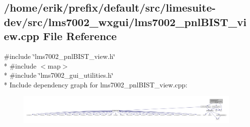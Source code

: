 \subsection{/home/erik/prefix/default/src/limesuite-\/dev/src/lms7002\+\_\+wxgui/lms7002\+\_\+pnl\+B\+I\+S\+T\+\_\+view.cpp File Reference}
\label{lms7002__pnlBIST__view_8cpp}
{\ttfamily \#include \char`\"{}lms7002\+\_\+pnl\+B\+I\+S\+T\+\_\+view.\+h\char`\"{}}\\*
{\ttfamily \#include $<$map$>$}\\*
{\ttfamily \#include \char`\"{}lms7002\+\_\+gui\+\_\+utilities.\+h\char`\"{}}\\*
Include dependency graph for lms7002\+\_\+pnl\+B\+I\+S\+T\+\_\+view.\+cpp\+:
\nopagebreak
\begin{figure}[H]
\begin{center}
\leavevmode
\includegraphics[width=350pt]{d6/d7c/lms7002__pnlBIST__view_8cpp__incl}
\end{center}
\end{figure}
